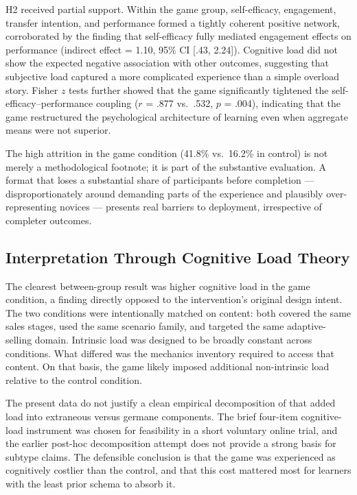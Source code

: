\documentclass[12pt]{report}
\begin{document}
H2 received partial support. Within the game group, self-efficacy, engagement, transfer intention, and performance formed a tightly coherent positive network, corroborated by the finding that self-efficacy fully mediated engagement effects on performance (indirect effect = 1.10, 95\% CI [.43, 2.24]). Cognitive load did not show the expected negative association with other outcomes, suggesting that subjective load captured a more complicated experience than a simple overload story. Fisher $z$ tests further showed that the game significantly tightened the self-efficacy--performance coupling ($r$ = .877 vs.\ .532, $p$ = .004), indicating that the game restructured the psychological architecture of learning even when aggregate means were not superior.

The high attrition in the game condition (41.8\% vs.\ 16.2\% in control) is not merely a methodological footnote; it is part of the substantive evaluation. A format that loses a substantial share of participants before completion --- disproportionately around demanding parts of the experience and plausibly over-representing novices --- presents real barriers to deployment, irrespective of completer outcomes.

\subsection{Interpretation Through Cognitive Load Theory}
The clearest between-group result was higher cognitive load in the game condition, a finding directly opposed to the intervention's original design intent. The two conditions were intentionally matched on content: both covered the same sales stages, used the same scenario family, and targeted the same adaptive-selling domain. Intrinsic load was designed to be broadly constant across conditions. What differed was the mechanics inventory required to access that content. On that basis, the game likely imposed additional non-intrinsic load relative to the control condition.

The present data do not justify a clean empirical decomposition of that added load into extraneous versus germane components. The brief four-item cognitive-load instrument was chosen for feasibility in a short voluntary online trial, and the earlier post-hoc decomposition attempt does not provide a strong basis for subtype claims. The defensible conclusion is that the game was experienced as cognitively costlier than the control, and that this cost mattered most for learners with the least prior schema to absorb it.
\end{document}
